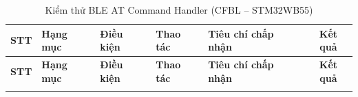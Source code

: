         \begin{longtable}{|c|p{}|p{}|p{}|p{}|c|}
            \caption{Kiểm thử BLE AT Command Handler (CFBL -- STM32WB55)}
            \label{tab:test_ble_at_handler} \\
            \hline
            \textbf{STT} & \textbf{Hạng mục} & \textbf{Điều kiện} & \textbf{Thao tác} & \textbf{Tiêu chí chấp nhận} & \textbf{Kết quả} \\ \hline
            \endfirsthead
            \hline
            \textbf{STT} & \textbf{Hạng mục} & \textbf{Điều kiện} & \textbf{Thao tác} & \textbf{Tiêu chí chấp nhận} & \textbf{Kết quả} \\ \hline
            \endhead
            \hline
            \endfoot
            \endlastfoot
        

\end{longtable}
